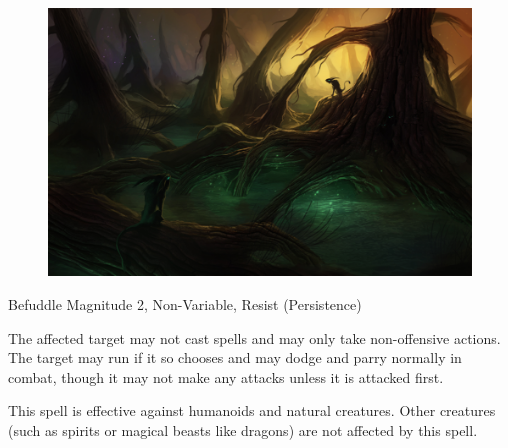 \begin{figure}
\begin{center}
\includegraphics[scale=2.1]{img/mystical_forest_by_sirend.jpg}
\end{center}
\end{figure}


\begin{rpg-spell}
{Befuddle}
{Magnitude 2, Non-Variable, Resist (Persistence)}

The affected target may not cast spells and may only take non-offensive actions. The target may run if it so chooses and may dodge and parry normally in combat, though it may not make any attacks unless it is attacked first. 

This spell is effective against humanoids and natural creatures. Other creatures (such as spirits or magical beasts like dragons) are not affected by this spell. 
\end{rpg-spell}


